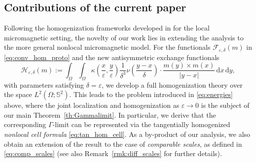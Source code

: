 \documentclass[reqno,11pt]{amsart}
\numberwithin{equation}{section}
\theoremstyle{thmlemcorr}
\numberwithin{theorem}{section}
\theoremstyle{thmlemcorr*}
\theoremstyle{defi}
\theoremstyle{remexample}
\theoremstyle{ass}
\newcommand{\1}{\mathds{1}}
\newcommand{\Om}{\Omega}
\newcommand{\veps}{\varepsilon}
\newcommand{\dl}{\,\mathrm{d}}
\begin{document}
 
	

	
	\subsection*{Contributions of the current paper} Following the homogenization frameworks developed in \cite{AlDF15, DaD20} for the local micromagnetic setting, the novelty of our work lies in extending the analysis to the more general nonlocal micromagnetic model. For the functionals $\mathcal{F}_{\veps,\delta}(m) $ in \eqref{eq:conv_hom_proto} and the new antisymmetric exchange functionals
    \begin{equation*}\label{eq:conv_hom_dmi}
		 {\mathcal{H}}_{\veps, \delta}(m)
		 :=\int_\Omega\int_\Omega \kappa\left(\frac{x}{\veps},\frac{y}{\veps}\right)  \frac{1}{\delta^3}\nu\left(\frac{y-x}{\delta}\right)\cdot\frac{m(y)\times m(x)}{|y-x|}\dl x\dl y,
	\end{equation*}
    with parameters satisfying \(\delta=\veps\), we develop a full homogenization theory over the space \(L^2(\Om;\mathbb{S}^2)\). This leads to the problem introduced in \eqref{eq:energies} above, where the joint localization and homogenization as \(\veps\to 0\) is the subject of our main Theorem~\ref{th:Gammalimit}. In particular, we derive that the corresponding \(\Gamma\)-limit can be represented via the tangentially homogenized \textit{nonlocal cell formula} \eqref{eq:tan_hom_cell}. As a by-product of our analysis, we also obtain an extension of the result to the case of \textit{comparable scales}, as defined in \eqref{eq:comp_scales} (see also Remark~\ref{rmk:diff_scales} for further details). %
    
\end{document}
